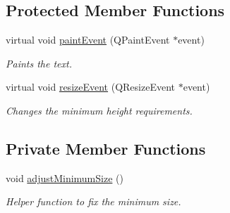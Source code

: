 \subsection*{Protected Member Functions}
\begin{DoxyCompactItemize}
\item 
virtual void \hyperlink{class_u_i_1_1_text_pane_a9a8be8083a29a1de509f53f2f4642d2b}{paint\-Event} (Q\-Paint\-Event $\ast$event)
\begin{DoxyCompactList}\small\item\em Paints the text. \end{DoxyCompactList}\item 
virtual void \hyperlink{class_u_i_1_1_text_pane_ab6a3f7957229704043360cec9a52d7ac}{resize\-Event} (Q\-Resize\-Event $\ast$event)
\begin{DoxyCompactList}\small\item\em Changes the minimum height requirements. \end{DoxyCompactList}\end{DoxyCompactItemize}
\subsection*{Private Member Functions}
\begin{DoxyCompactItemize}
\item 
\hypertarget{class_u_i_1_1_text_pane_af6a1e05178aabdce968975d859745a36}{void \hyperlink{class_u_i_1_1_text_pane_af6a1e05178aabdce968975d859745a36}{adjust\-Minimum\-Size} ()}\label{class_u_i_1_1_text_pane_af6a1e05178aabdce968975d859745a36}

\begin{DoxyCompactList}\small\item\em Helper function to fix the minimum size. \end{DoxyCompactList}\end{DoxyCompactItemize}

